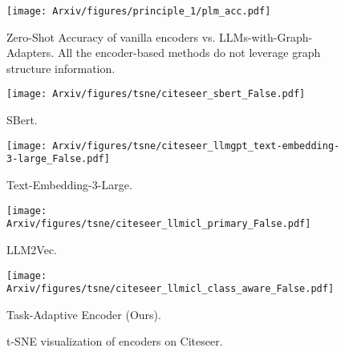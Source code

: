 \begin{figure}[t]
    \centering 
    \begin{minipage}{0.46\textwidth}  %
        \centering
        \texttt{[image: Arxiv/figures/principle\_1/plm\_acc.pdf]}
        
        \caption{Zero-Shot Accuracy of vanilla encoders vs. LLMs-with-Graph-Adapters. All the encoder-based methods do not leverage graph structure information.}
        \label{fig:principle_1}
    \end{minipage}
    \begin{minipage}{0.46\textwidth}  %
        \centering
        \begin{minipage}{0.49\textwidth}
            \centering
            \texttt{[image: Arxiv/figures/tsne/citeseer\_sbert\_False.pdf]}
            \caption*{\scriptsize SBert.}
        \end{minipage}
        \begin{minipage}{0.49\textwidth}
            \centering
            \texttt{[image: Arxiv/figures/tsne/citeseer\_llmgpt\_text-embedding-3-large\_False.pdf]}
            \caption*{\scriptsize Text-Embedding-3-Large.}
        \end{minipage}
        
        \begin{minipage}{0.47\textwidth}
            \centering
            \texttt{[image: Arxiv/figures/tsne/citeseer\_llmicl\_primary\_False.pdf]}
            \caption*{\scriptsize LLM2Vec.}
        \end{minipage}
        \begin{minipage}{0.47\textwidth}
            \centering
            \texttt{[image: Arxiv/figures/tsne/citeseer\_llmicl\_class\_aware\_False.pdf]}
            \caption*{\scriptsize Task-Adaptive Encoder (Ours).}
        \end{minipage}
        \caption{t-SNE visualization of encoders on Citeseer.}
        \label{fig:tsne}
    \end{minipage}
    \hfill
   
\end{figure}